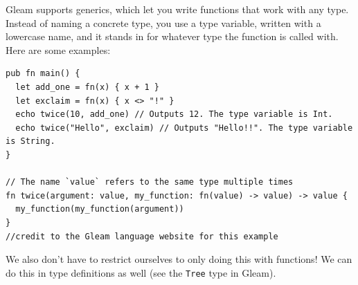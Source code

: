 \begin{blocksection}
Gleam supports generics, which let you write functions that work with any type. Instead of naming a concrete type, you use a type variable, written with a lowercase name, and it stands in for whatever type the function is called with.
Here are some examples: 
\begin{lstlisting}
pub fn main() {
  let add_one = fn(x) { x + 1 }
  let exclaim = fn(x) { x <> "!" }
  echo twice(10, add_one) // Outputs 12. The type variable is Int.
  echo twice("Hello", exclaim) // Outputs "Hello!!". The type variable is String.
}

// The name `value` refers to the same type multiple times
fn twice(argument: value, my_function: fn(value) -> value) -> value {
  my_function(my_function(argument))
}
//credit to the Gleam language website for this example
\end{lstlisting}
\par
We also don't have to restrict ourselves to only doing this with functions! We can do this in type definitions as well (see the \lstinline{Tree} type in Gleam).
\end{blocksection}